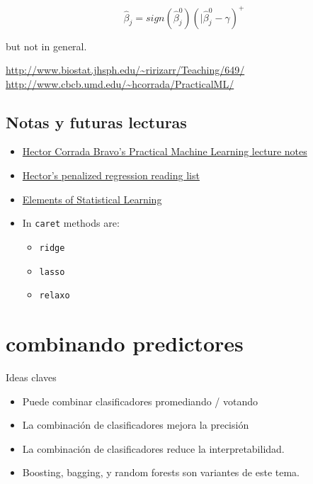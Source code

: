 \documentclass[
]{article}
\providecommand{\tightlist}{%
  \setlength{\itemsep}{0pt}\setlength{\parskip}{0pt}}
\begin{document}
\[\hat{\beta}_j = sign(\hat{\beta}_j^0)(|\hat{\beta}_j^0 - \gamma)^{+}\]

but not in general.

\url{http://www.biostat.jhsph.edu/~ririzarr/Teaching/649/}
\url{http://www.cbcb.umd.edu/~hcorrada/PracticalML/}

\hypertarget{notas-y-futuras-lecturas}{%
\subsection{Notas y futuras lecturas}\label{notas-y-futuras-lecturas}}

\begin{itemize}
\tightlist
\item
  \href{http://www.cbcb.umd.edu/~hcorrada/PracticalML/}{Hector Corrada
  Bravo's Practical Machine Learning lecture notes}
\item
  \href{http://www.cbcb.umd.edu/~hcorrada/AMSC689.html\#readings}{Hector's
  penalized regression reading list}
\item
  \href{http://statweb.stanford.edu/~tibs/ElemStatLearn/}{Elements of
  Statistical Learning}
\item
  In \texttt{caret} methods are:

  \begin{itemize}
  \tightlist
  \item
    \texttt{ridge}
  \item
    \texttt{lasso}
  \item
    \texttt{relaxo}
  \end{itemize}
\end{itemize}

\hypertarget{combinando-predictores}{%
\section{combinando predictores}\label{combinando-predictores}}

Ideas claves

\begin{itemize}
\tightlist
\item
  Puede combinar clasificadores promediando / votando
\item
  La combinación de clasificadores mejora la precisión
\item
  La combinación de clasificadores reduce la interpretabilidad.
\item
  Boosting, bagging, y random forests son variantes de este tema.
\end{itemize}
\end{document}
